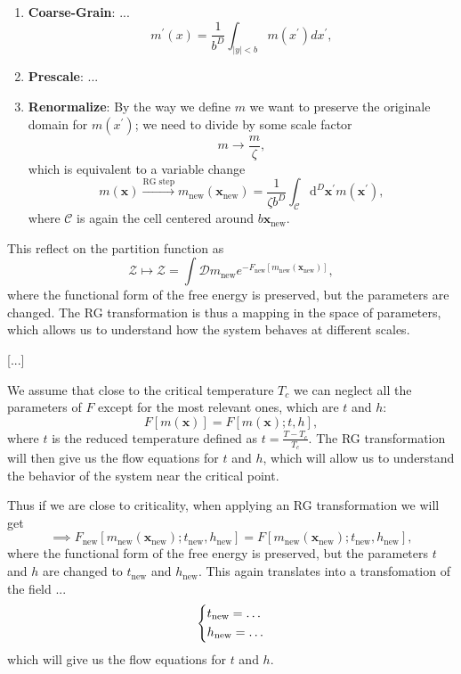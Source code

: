 \begin{enumerate}
    \item \textbf{Coarse-Grain}: ...
          \[
              m^{\prime}(x) = \frac{1}{b^D} \int_{|y| < b} m(x^{\prime}) dx^{\prime},
          \]
    \item \textbf{Prescale}: ...
    \item \textbf{Renormalize}: By the way we define \(m\) we want to preserve the originale domain for \(m(x^{\prime})\); we need to divide by some scale factor
          \[
              m \to \frac{m}{\zeta},
          \]
          which is equivalent to a variable change
          \[
              m(\mathbf{x}) \xrightarrow{\text{RG step}} m_{\text{new}}(\mathbf{x}_{\text{new}}) = \frac{1}{\zeta b^{D}}\int_{\mathcal{C}} \mathrm{d}^D \mathbf{x}^{\prime} m(\mathbf{x}^{\prime}),
          \]
          where \(\mathcal{C}\) is again the cell centered around \(b \mathbf{x}_{\text{new}}\).
\end{enumerate}

This reflect on the partition function as
\[
    \mathcal{Z} \mapsto \mathcal{Z} = \int \mathcal{D} m_{\text{new}} e^{-F_{\text{new}}[m_{\text{new}}(\mathbf{x}_{\text{new}})]},
\]
where the functional form of the free energy is preserved, but the parameters are changed. The RG transformation is thus a mapping in the space of parameters, which allows us to understand how the system behaves at different scales.

    [...]

We assume that close to the critical temperature \(T_c\) we can neglect all the parameters of \(F\) except for the most relevant ones, which are \(t\) and \(h\):
\[
    F[m(\mathbf{x})] = F[m(\mathbf{x}); t, h],
\]
where \(t\) is the reduced temperature defined as \(t = \frac{T - T_c}{T_c}\). The RG transformation will then give us the flow equations for \(t\) and \(h\), which will allow us to understand the behavior of the system near the critical point.

Thus if we are close to criticality, when applying an RG transformation we will get
\[
    \implies F_{\text{new}}[m_{\text{new}}(\mathbf{x}_{\text{new}}); t_{\text{new}}, h_{\text{new}}] = F[m_{\text{new}}(\mathbf{x}_{\text{new}}); t_{\text{new}}, h_{\text{new}}],
\]
where the functional form of the free energy is preserved, but the parameters \(t\) and \(h\) are changed to \(t_{\text{new}}\) and \(h_{\text{new}}\). This again translates into a transfomation of the field ...
\[
    \begin{dcases}
        t_{\text{new}} = \dots \\
        h_{\text{new}} = \dots
    \end{dcases}
\]
which will give us the flow equations for \(t\) and \(h\).

